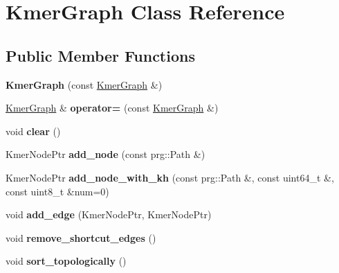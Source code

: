 \hypertarget{classKmerGraph}{}\section{Kmer\+Graph Class Reference}
\label{classKmerGraph}
\subsection*{Public Member Functions}
\begin{DoxyCompactItemize}
\item 
\mbox{\label{classKmerGraph_af67c4691c4b2fb36e884c4b92457e285}} 
{\bfseries Kmer\+Graph} (const \hyperlink{classKmerGraph}{Kmer\+Graph} \&)
\item 
\mbox{\label{classKmerGraph_a96ca7d2a4b907c02154197e1e473a520}} 
\hyperlink{classKmerGraph}{Kmer\+Graph} \& {\bfseries operator=} (const \hyperlink{classKmerGraph}{Kmer\+Graph} \&)
\item 
\mbox{\label{classKmerGraph_a0361de8df9c1d5352926f868c0304a03}} 
void {\bfseries clear} ()
\item 
\mbox{\label{classKmerGraph_abf362d653e5ce7c26f38805e12c74598}} 
Kmer\+Node\+Ptr {\bfseries add\+\_\+node} (const prg\+::\+Path \&)
\item 
\mbox{\label{classKmerGraph_a8eb18d952abad108c4c8ac3351686c15}} 
Kmer\+Node\+Ptr {\bfseries add\+\_\+node\+\_\+with\+\_\+kh} (const prg\+::\+Path \&, const uint64\+\_\+t \&, const uint8\+\_\+t \&num=0)
\item 
\mbox{\label{classKmerGraph_ae31a2fc24abbdaad8f53f9cd2dcee326}} 
void {\bfseries add\+\_\+edge} (Kmer\+Node\+Ptr, Kmer\+Node\+Ptr)
\item 
\mbox{\label{classKmerGraph_ae9669839acdd1a7b7a27bd13c1a37fad}} 
void {\bfseries remove\+\_\+shortcut\+\_\+edges} ()
\item 
\mbox{\label{classKmerGraph_a05db79db14d871a9c63a20ef079f2cb4}} 
void {\bfseries sort\+\_\+topologically} ()
\item 
\mbox{\label{classKmerGraph_a30bfd9da5440b318790b440f5e7da886}} 

\end{DoxyCompactItemize}
